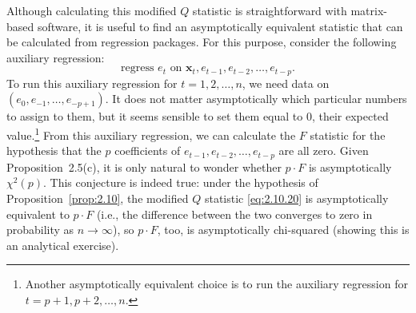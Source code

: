 Although calculating this modified $Q$ statistic is straightforward with matrix-based
software, it is useful to find an asymptotically equivalent statistic that can be calculated from regression packages. For this purpose, consider the following auxiliary
regression:
%
\begin{equation}
\text{regress } e_t \text{ on } \mathbf{x}_t, e_{t-1}, e_{t-2}, \ldots, e_{t-p}.
\label{eq:2.10.21}
\end{equation}
%
To run this auxiliary regression for $t = 1, 2, \ldots, n$, we need data on
$(e_0, e_{-1}, \ldots, e_{-p+1})$. It does not matter asymptotically which particular numbers
to assign to them, but it seems sensible to set them equal to 0, their expected
value.\footnote{Another asymptotically equivalent choice is to run the auxiliary
regression for $t = p+1, p+2, \ldots, n$.}
From this auxiliary regression, we can calculate the $F$ statistic for the hypothesis
that the $p$ coefficients of $e_{t-1}, e_{t-2}, \ldots, e_{t-p}$ are all zero. Given
Proposition~2.5(c), it is only natural to wonder whether $p \cdot F$ is asymptotically
$\chi^2(p)$. This conjecture is indeed true: under the hypothesis of Proposition~\ref{prop:2.10}, the modified $Q$ statistic \eqref{eq:2.10.20} is
asymptotically equivalent to $p \cdot F$ (i.e., the difference between the two converges
to zero in probability as $n \to \infty$), so $p \cdot F$, too, is asymptotically chi-squared
(showing this is an analytical exercise).

